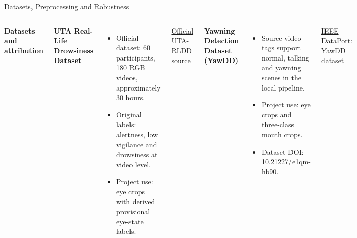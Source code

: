\documentclass[aspectratio=169,10pt]{beamer}
\renewcommand{\arraystretch}{1.22}
\begin{document}
\begin{frame}[t]{Datasets, Preprocessing and Robustness}
\fontsize{10}{11.5}\selectfont
\renewcommand{\arraystretch}{1.06}
\setlength{\tabcolsep}{4pt}
\setlength{\abovedisplayskip}{4pt}
\setlength{\belowdisplayskip}{4pt}
\begin{columns}[T,onlytextwidth]
\textbf{Datasets and attribution}\par\vspace{1pt}
\textbf{UTA Real-Life Drowsiness Dataset}\par\vspace{1pt}
\begin{itemize}\setlength\itemsep{0pt}
\item Official dataset: 60 participants, 180 RGB videos, approximately 30 hours.
\item Original labels: alertness, low vigilance and drowsiness at video level.
\item Project use: eye crops with derived provisional eye-state labels.
\end{itemize}
\href{https://sites.google.com/view/utarldd/home}{Official UTA-RLDD source}\par\vspace{1pt}
\textbf{Yawning Detection Dataset (YawDD)}\par\vspace{1pt}
\begin{itemize}\setlength\itemsep{0pt}
\item Source video tags support normal, talking and yawning scenes in the local pipeline.
\item Project use: eye crops and three-class mouth crops.
\item Dataset DOI: \href{https://doi.org/10.21227/e1qm-hb90}{10.21227/e1qm-hb90}.
\end{itemize}
\href{https://ieee-dataport.org/open-access/yawdd-yawning-detection-dataset}{IEEE DataPort: YawDD dataset}


\end{columns}
\end{frame}
\end{document}
